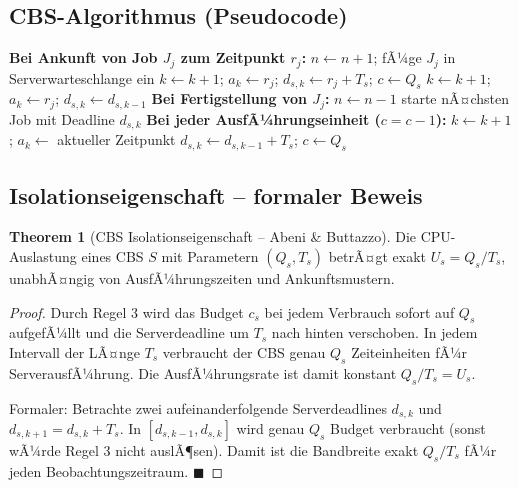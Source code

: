 ﻿\documentclass[a4paper,12pt]{report}
\theoremstyle{definition}
\newtheorem{theorem}{Theorem}[chapter]
\begin{document}
\subsection{CBS-Algorithmus (Pseudocode)}

\begin{algorithm}[H]
	\caption{Constant Bandwidth Server (CBS)}
	\begin{algorithmic}[1]
		\State \textbf{Bei Ankunft von Job $J_j$ zum Zeitpunkt $r_j$:}
		\State $n \leftarrow n+1$; fÃ¼ge $J_j$ in Serverwarteschlange ein
		 
		 
		\State $k \leftarrow k+1$; $a_k \leftarrow r_j$; $d_{s,k} \leftarrow r_j + T_s$; $c \leftarrow Q_s$
		\Else {}
		\State $k \leftarrow k+1$; $a_k \leftarrow r_j$; $d_{s,k} \leftarrow d_{s,k-1}$
		\EndIf
		\EndIf
		\State
		\State \textbf{Bei Fertigstellung von $J_j$:}
		\State $n \leftarrow n-1$
		 starte nÃ¤chsten Job mit Deadline $d_{s,k}$ \EndIf
		\State
		\State \textbf{Bei jeder AusfÃ¼hrungseinheit ($c = c - 1$):}
		 
		\State $k \leftarrow k+1$; $a_k \leftarrow$ aktueller Zeitpunkt
		\State $d_{s,k} \leftarrow d_{s,k-1} + T_s$; $c \leftarrow Q_s$
		\EndIf
	\end{algorithmic}
\end{algorithm}

\subsection{Isolationseigenschaft -- formaler Beweis}

\begin{theorem}[CBS Isolationseigenschaft -- Abeni \& Buttazzo]
	\label{thm:cbs_isolation}
	Die CPU-Auslastung eines CBS $S$ mit Parametern $(Q_s, T_s)$ betrÃ¤gt
	exakt $U_s = Q_s/T_s$, unabhÃ¤ngig von AusfÃ¼hrungszeiten und Ankunftsmustern.
\end{theorem}

\begin{proof}
	Durch Regel 3 wird das Budget $c_s$ bei jedem Verbrauch sofort auf $Q_s$
	aufgefÃ¼llt und die Serverdeadline um $T_s$ nach hinten verschoben. In jedem
	Intervall der LÃ¤nge $T_s$ verbraucht der CBS genau $Q_s$ Zeiteinheiten fÃ¼r
	ServerausfÃ¼hrung. Die AusfÃ¼hrungsrate ist damit konstant $Q_s/T_s = U_s$.

	Formaler: Betrachte zwei aufeinanderfolgende Serverdeadlines $d_{s,k}$ und
	$d_{s,k+1} = d_{s,k} + T_s$. In $[d_{s,k-1}, d_{s,k}]$ wird genau $Q_s$
	Budget verbraucht (sonst wÃ¼rde Regel 3 nicht auslÃ¶sen). Damit ist die
	Bandbreite exakt $Q_s/T_s$ fÃ¼r jeden Beobachtungszeitraum. \hfill$\blacksquare$
\end{proof}
\end{document}
